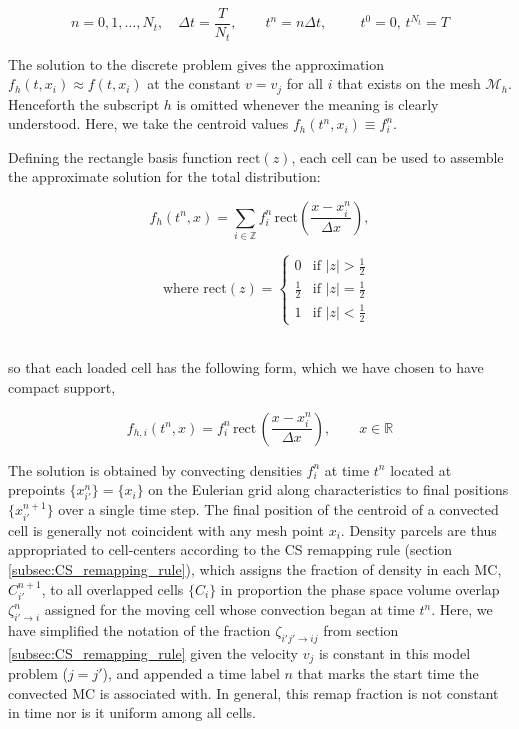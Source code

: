 \documentclass[11pt,titlepage]{report}
\begin{document}
\begin{equation}
n = 0,1,\ldots, N_t, \quad \Delta t = \frac{T}{N_t}, \qquad t^n = n\Delta t , \phantom{x_0 + }\, t^0 = 0, \, t^{N_t} = T 
\end{equation}

\noindent The solution to the discrete problem gives the approximation $f_h(t,x_i) \approx f(t,x_i)$ at the constant $v = v_j$ for all $i$ that exists on the mesh $\mathcal{M}_h$. Henceforth the subscript $h$ is omitted whenever the meaning is clearly understood. Here, we take the centroid values $f_h(t^n,x_i) \equiv f_i^n$.

Defining the rectangle basis function $\mathrm{rect} (z)$, each cell can be used to assemble the approximate solution for the total distribution:\\[1em]


\begin{minipage}{0.4\textwidth}
$$f_h(t^n,x) = \sum_{i\in\mathbb{Z}} f_i^n \, \mathrm{rect}\left(\frac{x - x^n_i}{\Delta x}\right),$$
\end{minipage}
\begin{minipage}{0.4\textwidth}
$$\quad \textrm{where } \mathrm{rect} (z) =
  \begin{cases}
   0 & \text{if } |z| > \tfrac{1}{2} \\[0.3em]
   \tfrac{1}{2} & \text{if } |z| = \tfrac{1}{2}\\[0.3em]
   1 & \text{if } |z| < \tfrac{1}{2}
  \end{cases}
$$
\end{minipage}\\[1em]

\noindent so that each loaded cell has the following form, which we have chosen to have compact support,

$$f_{h,i}(t^n,x) = f_i^n\,\mathrm{rect}\,\left(\frac{x - x^n_i}{\Delta x}\right), \qquad x\in\mathbb{R}$$

The solution is obtained by convecting densities $f^n_{i}$ at time $t^n$ located at prepoints $\{x^n_{i'}\} = \{x_{i}\}$ on the Eulerian grid along characteristics to final positions $\{x_{i'}^{n+1}\}$ over a single time step. The final position of the centroid of a convected cell is generally not coincident with any mesh point $x_{i}$. Density parcels are thus appropriated to cell-centers according to the CS remapping rule (section \ref{subsec:CS_remapping_rule}), which assigns the fraction of density in each MC, $C^{n+1}_{i'}$, to all overlapped cells $\{C_i\}$ in proportion the phase space volume overlap $\zeta^n_{i'\to i}$ assigned for the moving cell whose convection began at time $t^n$. Here, we have simplified the notation of the fraction $\zeta_{i'j'\to ij}$ from section \ref{subsec:CS_remapping_rule} given the velocity $v_j$ is constant in this model problem ($j = j'$), and appended a time label $n$ that marks the start time the convected MC is associated with. In general, this remap fraction is not constant in time nor is it uniform among all cells.
\end{document}
